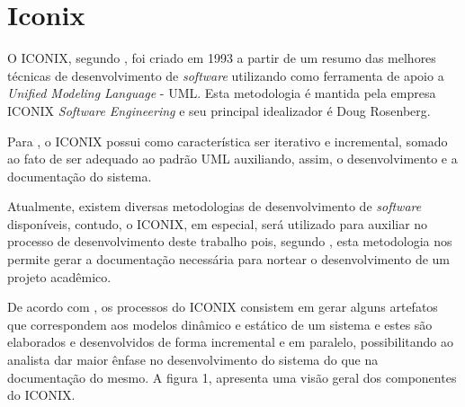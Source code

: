 \section{Iconix}

\par O ICONIX, segundo , foi criado em 1993 a partir de um resumo das melhores técnicas de desenvolvimento de \textit{software} utilizando como ferramenta de apoio a \textit{Unified Modeling Language} - UML\footnotemark[3]. Esta metodologia é mantida pela empresa ICONIX \textit{Software Engineering} e seu principal idealizador é Doug Rosenberg.



\par Para , o ICONIX possui como característica ser iterativo e incremental, somado ao fato de ser adequado ao padrão UML auxiliando, assim, o desenvolvimento e a documentação do sistema.

\par Atualmente, existem diversas metodologias de desenvolvimento de \textit{software} disponíveis, contudo, o ICONIX, em especial, será utilizado para auxiliar no processo de desenvolvimento deste trabalho pois, segundo
, esta metodologia nos permite gerar a documentação necessária para nortear o desenvolvimento de um projeto acadêmico.

\par De acordo com , os processos do ICONIX consistem em gerar alguns artefatos que correspondem aos modelos dinâmico e estático de um sistema e estes são elaborados e desenvolvidos de forma incremental e em paralelo, possibilitando ao analista dar maior ênfase no desenvolvimento do sistema do que na documentação do mesmo. A figura 1, apresenta uma visão geral dos componentes do ICONIX.

